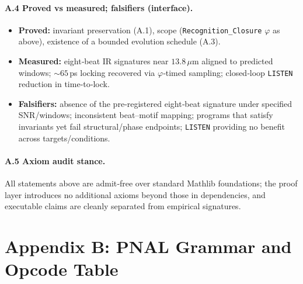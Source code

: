 \documentclass[12pt,a4paper]{article}
\begin{document}
\paragraph{A.4 Proved vs measured; falsifiers (interface).}
\begin{itemize}
  \item \textbf{Proved:} invariant preservation (A.1), scope (\texttt{Recognition\_Closure} $\varphi$ as above), existence of a bounded evolution schedule (A.3).
  \item \textbf{Measured:} eight‑beat IR signatures near $13.8\,\mu$m aligned to predicted windows; $\sim 65$\,ps locking recovered via $\varphi$‑timed sampling; closed‑loop \texttt{LISTEN} reduction in time‑to‑lock.
  \item \textbf{Falsifiers:} absence of the pre‑registered eight‑beat signature under specified SNR/windows; inconsistent beat–motif mapping; programs that satisfy invariants yet fail structural/phase endpoints; \texttt{LISTEN} providing no benefit across targets/conditions.
\end{itemize}

\paragraph{A.5 Axiom audit stance.}
All statements above are admit‑free over standard Mathlib foundations; the proof layer introduces no additional axioms beyond those in dependencies, and executable claims are cleanly separated from empirical signatures.

\section*{Appendix B: PNAL Grammar and Opcode Table}
\end{document}
